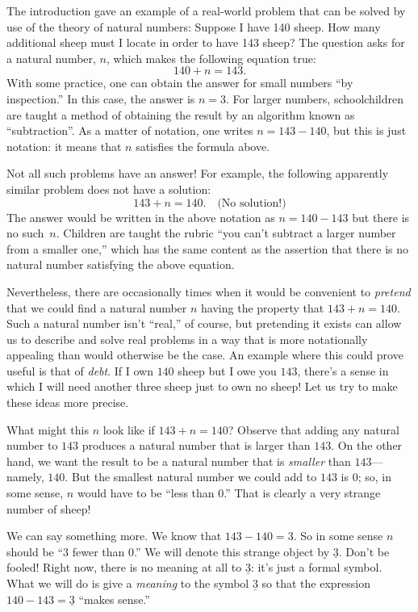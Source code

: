 \documentclass[10pt, a4paper, twocolumn]{article}
\newcommand{\minus}[1]{\underline{#1}}
\begin{document}
The introduction gave an example of a real-world problem that can be
solved by use of the theory of natural numbers: Suppose I have 140
sheep. How many additional sheep must I locate in order to have 143
sheep? The question asks for a natural number, $n$, which makes the
following equation true:
\begin{equation*}
140 + n = 143.
\end{equation*}
With some practice, one can obtain the answer for small numbers ``by
inspection.'' In this case, the answer is $n=3$. For larger numbers,
schoolchildren are taught a method of obtaining the result by an
algorithm known as ``subtraction''. As a matter of notation, one
writes $n = 143 - 140$, but this is just notation: it means that $n$
satisfies the formula above.

Not all such problems have an answer! For example, the following
apparently similar problem does not have a solution:
\begin{equation*}
143 + n = 140. \quad\text{(No solution!)}
\end{equation*}
The answer would be written in the above notation as $n=140-143$ but there
is no such~$n$. Children are taught the rubric ``you can't
subtract a larger number from a smaller one,'' which has the same
content as the assertion that there is no natural number satisfying
the above equation.

Nevertheless, there are occasionally times when it would be convenient
to \emph{pretend} that we could find a natural number $n$ having the
property that $143+n=140$. Such a natural number isn't ``real,'' of
course, but pretending it exists can allow us to describe and solve
real problems in a way that is more notationally appealing than would
otherwise be the case. An example where this could prove useful is
that of \emph{debt}. If I own $140$ sheep but I owe you $143$, there's
a sense in which I will need another three sheep just to own no sheep!
Let us try to make these ideas more precise.

What might this $n$ look like if $143+n=140$? Observe that adding any natural
number to $143$ produces a natural number that is larger than
$143$. On the other hand, we want the result to be a natural number
that is \emph{smaller} than $143$---namely, $140$. But the smallest
natural number we could add to $143$ is $0$; so, in some sense, $n$
would have to be ``less than $0$.'' That is clearly a very strange
number of sheep!

We can say something more. We know that $143-140=3$. So in some sense
$n$ should be ``$3$ fewer than $0$.'' We will denote this strange
object by $\minus{3}$. Don't be fooled! Right now, there is no meaning
at all to $\minus{3}$: it's just a formal symbol. What we will do is
give a \emph{meaning} to the symbol $\minus{3}$ so that the expression
$140 - 143 = \minus{3}$ ``makes sense.''
\end{document}
